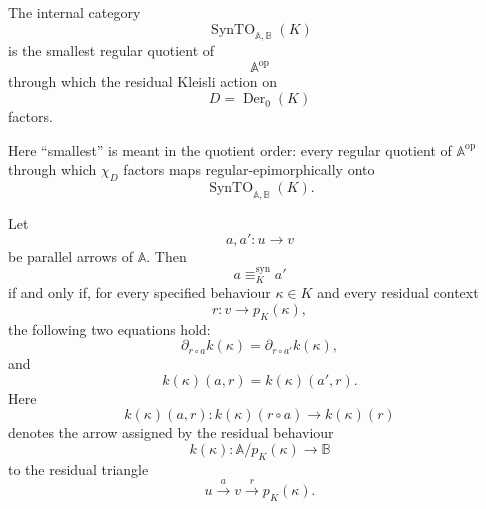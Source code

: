 \begin{corollary}
\label{cor:syn-to-smallest-regular-quotient}
    The internal category
    \[
        \operatorname{SynTO}_{\mathbb A,\mathbb B}(K)
    \]
    is the smallest regular quotient of
    \[
        \mathbb A^{\mathrm{op}}
    \]
    through which the residual Kleisli action on
    \[
        D=\operatorname{Der}_0(K)
    \]
    factors.
\end{corollary}

\begin{remark}
\label{rem:syn-to-smallest-quotient-order}
    Here ``smallest'' is meant in the quotient order: every regular quotient of
    \(\mathbb A^{\mathrm{op}}\) through which \(\chi_D\) factors maps
    regular-epimorphically onto
    \[
        \operatorname{SynTO}_{\mathbb A,\mathbb B}(K).
    \]
\end{remark}

\begin{theorem}
\label{thm:syn-to-context-expansion}
    Let
    \[
        a,a':u\to v
    \]
    be parallel arrows of \(\mathbb A\). Then
    \[
        a\equiv_K^{\mathrm{syn}}a'
    \]
    if and only if, for every specified behaviour \(\kappa\in K\) and every
    residual context
    \[
        r:v\to p_K(\kappa),
    \]
    the following two equations hold:
    \[
        \partial_{r\circ a}k(\kappa)
        =
        \partial_{r\circ a'}k(\kappa),
    \]
    and
    \[
        k(\kappa)(a,r)=k(\kappa)(a',r).
    \]
    Here
    \[
        k(\kappa)(a,r):
        k(\kappa)(r\circ a)\to k(\kappa)(r)
    \]
    denotes the arrow assigned by the residual behaviour
    \[
        k(\kappa):\mathbb A/p_K(\kappa)\to\mathbb B
    \]
    to the residual triangle
    \[
        u\xrightarrow{a}v\xrightarrow{r}p_K(\kappa).
    \]
\end{theorem}

